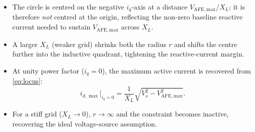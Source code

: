 \documentclass[a4paper,11pt]{article}
\begin{document}
\begin{itemize}
	\item The circle is centred on the negative $i_q$-axis at a distance
	$V_\mathrm{AFE,max}/X_L$; it is therefore \emph{not} centred at
	the origin, reflecting the non-zero baseline reactive current
	needed to sustain $V_\mathrm{AFE,max}$ across $X_L$.
	\item A larger $X_L$ (weaker grid) shrinks both the radius $r$ and
	shifts the centre further into the inductive quadrant, tightening
	the reactive-current margin.
	\item At unity power factor ($i_q = 0$), the maximum active current
	is recovered from \eqref{eq:locus}:
	\begin{equation}
		i_{d,\max}\big|_{i_q=0}
		= \frac{1}{X_L}
		\sqrt{V_s^2 - V_\mathrm{AFE,max}^2}.
		\label{eq:idmax}
	\end{equation}
	\item For a stiff grid ($X_L \to 0$), $r \to \infty$ and the
	constraint becomes inactive, recovering the ideal voltage-source
	assumption.
\end{itemize}
\end{document}
